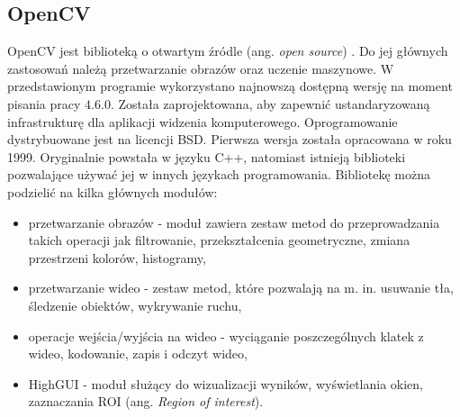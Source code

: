 \subsection{OpenCV}
OpenCV jest biblioteką o otwartym źródle (ang. \textit{open source}) \cite{open_cv,open_cv_docs} .
Do jej głównych zastosowań należą przetwarzanie obrazów oraz uczenie maszynowe.
W przedstawionym programie wykorzystano najnowszą dostępną wersję na moment pisania pracy $4.6.0$.
Została zaprojektowana, aby zapewnić ustandaryzowaną infrastrukturę dla aplikacji widzenia komputerowego.
Oprogramowanie dystrybuowane jest na licencji BSD.
Pierwsza wersja została opracowana w roku 1999.
Oryginalnie powstała w języku C++, natomiast istnieją biblioteki pozwalające używać jej w innych językach programowania.
Bibliotekę można podzielić na kilka głównych modułów:
\begin{itemize}
    \item przetwarzanie obrazów - moduł zawiera zestaw metod do przeprowadzania takich operacji jak filtrowanie, przekształcenia geometryczne, zmiana przestrzeni kolorów, histogramy,
    \item przetwarzanie wideo - zestaw metod, które pozwalają na m. in. usuwanie tła, śledzenie obiektów, wykrywanie ruchu,
    \item operacje wejścia/wyjścia na wideo - wyciąganie poszczególnych klatek z wideo, kodowanie, zapis i odczyt wideo,
    \item HighGUI - moduł służący do wizualizacji wyników, wyświetlania okien, zaznaczania ROI (ang. \textit{Region of interest}).
\end{itemize}

